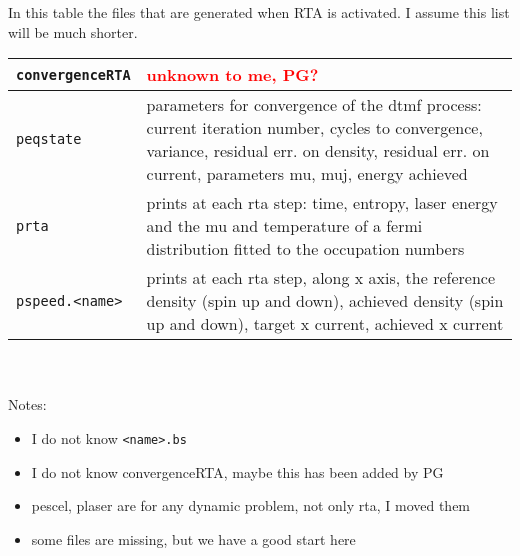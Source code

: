 \documentclass[11pt]{article}
\begin{document}
In this table the files that are generated when RTA is activated. I assume this list will be much shorter.\\
\begin{tabular}{|p{4.5cm}|p{10.2cm}|}
	\hline
	\texttt{convergenceRTA} & \textcolor{red}{ unknown to me, PG?}\\
	\hline
	\texttt{peqstate} &  parameters for convergence of the dtmf process: current iteration number, cycles to convergence, variance, residual err. on density, residual err. on current, parameters mu, muj, energy achieved\\
	\hline
	\texttt{prta} & prints at each rta  step: time, entropy, laser energy and the mu and temperature of a fermi distribution fitted to the occupation numbers\\
	\hline
	\texttt{pspeed.<name>} & prints at each rta step, along x axis, the reference density (spin up and down), achieved density (spin up and down), target x current, achieved x current \\
	\hline
\end{tabular}
\\
\\
Notes: 
\begin{itemize}
\item I do not know \texttt{<name>.bs}
\item I do not know convergenceRTA, maybe this has been added by PG
\item pescel, plaser are for any dynamic problem, not only rta, I moved them
\item some files are missing, but we have a good start here
\end{itemize}
\end{document}
